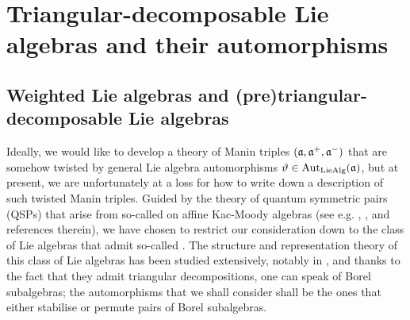 \section{Triangular-decomposable Lie algebras and their automorphisms}
    \subsection{Weighted Lie algebras and (pre)triangular-decomposable Lie algebras}
        Ideally, we would like to develop a theory of Manin triples $(\mathfrak{a}, \mathfrak{a}^+, \mathfrak{a}^-)$ that are somehow twisted by general Lie algebra automorphisms $\vartheta \in \operatorname{Aut}_{\mathrm{Lie}\mathrm{Alg}}(\mathfrak{a})$, but at present, we are unfortunately at a loss for how to write down a description of such twisted Manin triples. Guided by the theory of quantum symmetric pairs (QSPs) that arise from so-called  on affine Kac-Moody algebras (see e.g. \cite{regelskis_vlaar_reflection_matrices_coideal_subalgebras}, \cite{kolb_kac_moody_QSPs}, and references therein), we have chosen to restrict our consideration down to the class of Lie algebras that admit so-called . The structure and representation theory of this class of Lie algebras has been studied extensively, notably in \cite{moody_pianzola_lie_algebras_with_triangular_decompositions}, and thanks to the fact that they admit triangular decompositions, one can speak of Borel subalgebras; the automorphisms that we shall consider shall be the ones that either stabilise or permute pairs of Borel subalgebras.
        
